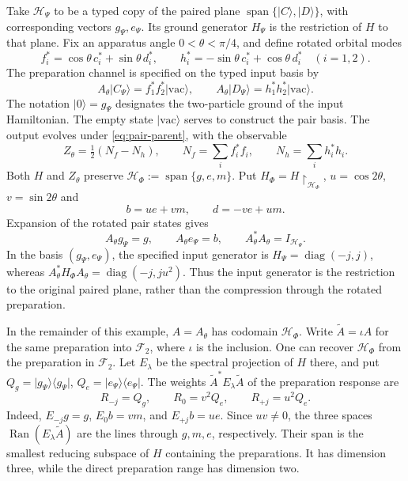 \documentclass[11pt,reqno]{scrartcl}
\newcommand{\scrHP}{\mathscr H_{\Psi}}
\newcommand{\scrHF}{\mathscr H_{\Phi}}
\newcommand{\ket}[1]{\lvert #1\rangle}
\newcommand{\bra}[1]{\langle #1\rvert}
\newcommand{\proj}[1]{\ket{#1}\!\bra{#1}}
\DeclareMathOperator{\Ran}{Ran}
\DeclareMathOperator{\diag}{diag}
\DeclareMathOperator{\Span}{span}
\newcommand{\restr}[2]{#1\!\upharpoonright_{#2}}
\theoremstyle{plain}
\theoremstyle{definition}
\theoremstyle{remark}
\begin{document}
Take $\scrHP$ to be a typed copy of the paired plane
$\Span\{\ket C,\ket D\}$, with corresponding vectors $g_{\Psi},e_{\Psi}$.
Its ground generator $H_{\Psi}$ is the restriction of $H$ to that plane.
Fix an apparatus angle $0<\theta<\pi/4$, and define rotated orbital modes
\begin{equation}
  f_i^*=\cos\theta\,c_i^*+\sin\theta\,d_i^*,\qquad
  h_i^*=-\sin\theta\,c_i^*+\cos\theta\,d_i^*
  \quad(i=1,2).
  \label{eq:pair-orbital-rotation}
\end{equation}
The preparation channel is specified on the typed input basis by
\begin{equation}
 A_\theta\ket{C_\Psi}=f_1^*f_2^*\ket{\mathrm{vac}},\qquad
 A_\theta\ket{D_\Psi}=h_1^*h_2^*\ket{\mathrm{vac}} .
 \label{eq:pair-preparation-map}
\end{equation}
The notation $\ket0=g_\Psi$ designates the two-particle ground of the
input Hamiltonian.  The empty state $\ket{\mathrm{vac}}$ serves to
construct the pair basis.  The output evolves under
\eqref{eq:pair-parent}, with the observable
\begin{equation}
  Z_{\theta}=\tfrac12(N_f-N_h),\qquad
  N_f=\sum_i f_i^*f_i,\qquad N_h=\sum_i h_i^*h_i .
  \label{eq:pair-imbalance}
\end{equation}
Both $H$ and $Z_{\theta}$ preserve
$\scrHF:=\Span\{g,e,m\}$.  Put
$H_{\Phi}=\restr{H}{\scrHF}$, $u=\cos2\theta$,
$v=\sin2\theta$ and
\begin{equation}
  b=ue+vm,\qquad d=-ve+um .
  \label{eq:pair-bright-defect}
\end{equation}
Expansion of the rotated pair states gives
\begin{equation}
  A_{\theta}g_{\Psi}=g,\qquad A_{\theta}e_{\Psi}=b,
  \qquad A_{\theta}^*A_{\theta}=I_{\scrHP}.
  \label{eq:pair-channel}
\end{equation}
In the basis $(g_\Psi,e_\Psi)$, the specified input generator is
$H_\Psi=\diag(-j,j)$, whereas
$A_\theta^*H_\Phi A_\theta=\diag(-j,ju^2)$.
Thus the input generator is the restriction to the original paired
plane, rather than the compression through the rotated preparation.

In the remainder of this example, $A=A_{\theta}$ has codomain $\scrHF$.
Write $\widetilde A=\iota A$ for the same preparation into $\mathcal F_2$,
where $\iota$ is the inclusion.  One can recover $\scrHF$ from the
preparation in $\mathcal F_2$.  Let $E_\lambda$ be the spectral
projection of $H$ there, and put $Q_g=\proj{g_\Psi}$, $Q_e=\proj{e_\Psi}$.
The weights $\widetilde A^*E_\lambda\widetilde A$ of the preparation
response are
\begin{equation}
 R_{-j}=Q_g,\qquad R_0=v^2Q_e,\qquad R_{+j}=u^2Q_e .
 \label{eq:pair-port-weights}
\end{equation}
Indeed, $E_{-j}g=g$, $E_0 b=vm$, and $E_{+j}b=ue$.  Since $uv\ne0$,
the three spaces $\Ran(E_\lambda\widetilde A)$ are the lines through
$g,m,e$, respectively.  Their span is the smallest reducing subspace
of $H$ containing the preparations.  It has dimension three, while
the direct preparation range has dimension two.
\end{document}
